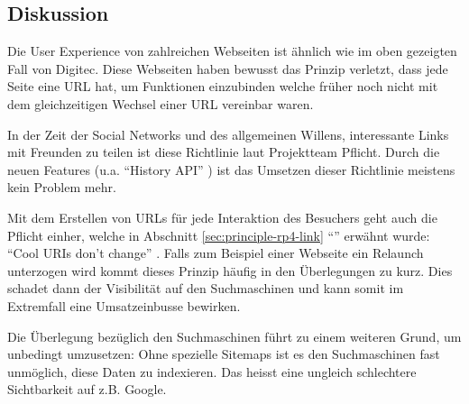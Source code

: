 \subsection*{Diskussion}
Die User Experience von zahlreichen Webseiten ist ähnlich wie im oben gezeigten Fall von Digitec. Diese Webseiten haben bewusst das Prinzip verletzt, dass jede Seite eine \gls{URL} hat, um Funktionen einzubinden welche früher noch nicht mit dem gleichzeitigen Wechsel einer \gls{URL} vereinbar waren.

In der Zeit der Social Networks und des allgemeinen Willens, interessante Links mit Freunden zu teilen ist diese Richtlinie laut Projektteam Pflicht. Durch die neuen Features (u.a. ``History API'' \cite{HistoryAPI}) ist das Umsetzen dieser Richtlinie meistens kein Problem mehr.

Mit dem Erstellen von \glspl{URL} für jede Interaktion des Besuchers geht auch die Pflicht einher, welche in Abschnitt \ref{sec:principle-rp4-link} ``'' erwähnt wurde: ``Cool URIs don't change''  \cite{CoolURIsTBL}. Falls zum Beispiel einer Webseite ein Relaunch unterzogen wird kommt dieses Prinzip häufig in den Überlegungen zu kurz. Dies schadet dann der Visibilität auf den Suchmaschinen und kann somit im Extremfall eine Umsatzeinbusse bewirken.

Die Überlegung bezüglich den Suchmaschinen führt zu einem weiteren Grund, um  unbedingt umzusetzen: Ohne spezielle Sitemaps \cite{Sitemap} ist es den Suchmaschinen fast unmöglich, diese Daten zu indexieren. Das heisst eine ungleich schlechtere Sichtbarkeit auf z.B. Google.